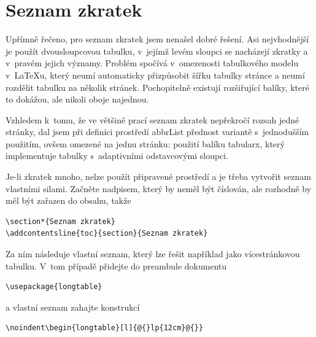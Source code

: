 \documentclass[FM,BP]{tulthesis}
\newcommand{\argument}[1]{{\ttfamily\color{\tulcolor}#1}}
\newenvironment{myquote}{\begin{list}{}{\setlength\leftmargin\parindent}\item[]}{\end{list}}
\newenvironment{listing}{\begin{myquote}\color{\tulcolor}}{\end{myquote}}
\begin{document}
\section{Seznam zkratek}\label{zkratky}

Upřímně řečeno, pro seznam zkratek jsem nenašel dobré řešení. Asi nejvhodnější
je použít dvousloupcovou tabulku, v~jejímž levém sloupci se nacházejí zkratky a
v~pravém jejich významy. Problém spočívá v~omezenosti tabulkového modelu
v~\LaTeX u, který neumí automaticky přizpůsobit šířku tabulky stránce a neumí
rozdělit tabulku na několik stránek. Pochopitelně existují rozšiřující balíky,
které to dokážou, ale nikoli oboje najednou.

Vzhledem k~tomu, že ve většině prací seznam zkratek nepřekročí rozsah jedné
stránky, dal jsem při definici prostředí \argument{abbrList} přednost variantě
s~jednodušším použitím, ovšem omezené na jednu stránku: použití balíku
\argument{tabularx}, který implementuje tabulky s~adaptivními odstavcovými
sloupci.

Je-li zkratek mnoho, nelze použít připravené prostředí a je třeba vytvořit
seznam vlastními silami. Začněte nadpisem, který by neměl být číslován, ale
rozhodně by měl být zařazen do obsahu, takže

\begin{listing}
\begin{verbatim}
\section*{Seznam zkratek}
\addcontentsline{toc}{section}{Seznam zkratek}
\end{verbatim}
\end{listing}

Za ním následuje vlastní seznam, který lze řešit například jako vícestránkovou
tabulku. V~tom případě přidejte do preambule dokumentu

\begin{listing}
\begin{verbatim}
\usepackage{longtable}
\end{verbatim}
\end{listing}

a vlastní seznam zahajte konstrukcí

\begin{listing}
\begin{verbatim}
\noindent\begin{longtable}[l]{@{}lp{12cm}@{}}
\end{verbatim}
\end{listing}
\end{document}
